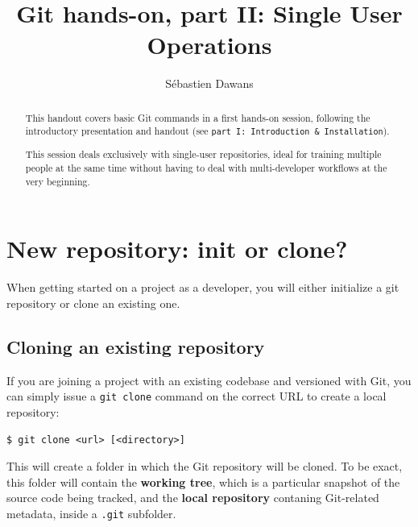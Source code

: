 \documentclass[a4paper]{../../common/tufte-latex/tufte-handout}
\title{Git hands-on, part II: Single User Operations}
\author{S\'ebastien Dawans}
\begin{document}
\maketitle%

\tableofcontents

\newpage

\begin{abstract}
\noindent
This handout covers basic Git commands in a first hands-on session, following the introductory presentation and handout (see \texttt{part I: Introduction \& Installation}).

This session deals exclusively with single-user repositories, ideal for training multiple people at the same time without having to deal with multi-developer workflows at the very beginning.
\end{abstract}

\section{New repository: init or clone?}

When getting started on a project as a developer, you will either initialize a git repository or clone an existing one.

\subsection{Cloning an existing repository}

If you are joining a project with an existing codebase and versioned with Git, you can simply issue a \texttt{git clone} command on the correct URL to create a local repository: 

\begin{lstlisting}[style=BashInputStyle]
  $ git clone <url> [<directory>]
\end{lstlisting}

This will create a folder in which the Git repository will be cloned.
To be exact, this folder will contain the \textbf{working tree}, which is a particular snapshot of the source code being tracked, and the \textbf{local repository} contaning Git-related metadata, inside a \texttt{.git} subfolder.
\end{document}
